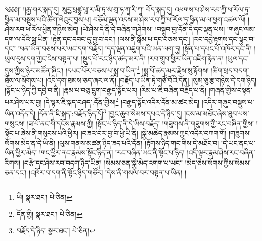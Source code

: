 \setcounter{footnote}{0} 
༄༅༅།། །།རྒྱ་གར་སྐད་དུ། ཨཱརྱ་པྲཛྙཱ་པཱ་ར་མི་ཏཱ་སཾ་གྲ་ཧ་ཀཱ་རི་ཀཱ། བོད་སྐད་དུ། འཕགས་པ་ཤེས་རབ་ཀྱི་ཕ་རོལ་ཏུ་ཕྱིན་མ་བསྡུས་པའི་ཚིག་ལེའུར་བྱས་པ། བཅོམ་ལྡན་འདས་མ་ཤེས་རབ་ཀྱི་ཕ་རོལ་ཏུ་ཕྱིན་མ་ལ་ཕྱག་འཚལ་ལོ། །ཤེས་རབ་ཕ་རོལ་ཕྱིན་གཉིས་མེད། །ཡེ་ཤེས་དེ་ནི་དེ་བཞིན་གཤེགས། །བསྒྲུབ་བྱ་དོན་དེ་དང་ལྡན་པས། །གཞུང་ལམ་དག་ལ་དེའི་སྒྲ་ཡིན། །རྟེན་དང་དབང་དུ་བྱ་བ་དང་། །ལས་ནི་སྒོམ་པ་དང་བཅས་དང་། །རབ་དབྱེ་རྟགས་དང་ལྟུང་བ་དང་། །ཕན་ཡོན་བཅས་པར་ཡང་དག་བརྗོད། །དད་ལྡན་འཇུག་པའི་ཡན་ལག་ཏུ། །སྟོན་པ་དཔང་པོ་འཁོར་དང་ནི། །ཡུལ་དུས་དག་ཀྱང་ངེས་བསྟན་པ། །སྡུད་པོ་རང་ཉིད་ཚད་མར་ནི། །རབ་གྲུབ་ཕྱིར་ཡིན་འཇིག་རྟེན་ན། །ཡུལ་དང་དུས་ཀྱིས་ཉེར་མཚོན་ཞིང་། །དཔང་པོར་བཅས་པ་སྨྲ་བ་ཡིན།\footnote{ཡི།  སྣར་ཐང་།  པེ་ཅིན། } །སྨྲ་པོ་ཚད་མར་རྗེས་སུ་རྟོགས། །ཚིག་ཕྲད་བདག་ཐོས་ལ་སོགས་པ། །འདི་དག་ཐམས་ཅད་ཞར་ལ་ནི། །བརྗོད་པ་ཡིན་ཏེ་གཙོ་བོའི་དོན། །སུམ་ཅུ་རྩ་གཉིས་དེ་དག་ཉིད། །སྟོང་པ་ཉིད་ཀྱི་དབྱེ་བ་ནི། །རྣམ་པ་བཅུ་དྲུག་བརྒྱད་སྟོང་པར། །རིམ་པ་ཇི་བཞིན་བརྗོད་པ་ནི། །གཞན་གྱིས་བསྟན་པར་ཤེས་པར་བྱ། །དེ་ལྟར་ཇི་སྐད་བཤད་:དོན་གྱིས།\footnote{དོན་གྱི།  སྣར་ཐང་།  པེ་ཅིན། } །བརྒྱད་སྟོང་འདིར་དོན་མ་ཚང་མེད། །འདིར་གཞུང་བསྡུས་པ་ཡིན་འདོད་དེ། །དོན་ནི་ཇི་སྐད་:བརྗོད་ཉིད་དོ།\footnote{བརྗོད་དེ་ཉིད།  སྣར་ཐང་།  པེ་ཅིན། } །བྱང་ཆུབ་སེམས་དཔའ་དེ་ཉིད་དུ། །ངས་མ་མཐོང་ཞེས་ཐུབ་པས་གསུངས། །ཟ་པོ་ནང་གི་དངོས་རྣམས་ཀྱི། །སྟོང་པ་ཉིད་ནི་དེ་ཡིས་བརྗོད། །གཟུགས་ནི་གཟུགས་ཀྱི་རང་བཞིན་གྱིས། །སྟོང་པ་ཞེས་ནི་གསུངས་པའི་ཕྱིར། །བཟའ་བར་བྱ་བ་ཕྱི་ཡི་ནི། །སྐྱེ་མཆེད་རྣམས་ཀྱང་འདིར་བཀག་གོ། །གཟུགས་སོགས་མེད་ན་དེ་ཡི་ནི། །ལུས་གནས་མཚན་ཉིད་ཟད་པའི་དོན། །རྟོགས་ཉིད་གང་གིས་དེ་མཐོང་བ། །དེ་ཡང་ནང་པ་ཡིན་ཕྱིར་མེད། །གང་ཕྱིར་ནང་རྣམས་སྟོང་ཉིད་ན། །རང་བཞིན་ཡང་ནི་སྟོང་པ་ཉིད། །འདི་ལྟར་རྣམ་ཤེས་རང་བཞིན་རིགས། །བརྩེ་དང་ཤེས་རབ་བདག་ཉིད་ཡིན། །སེམས་ཅན་སྐྱེ་མེད་འགག་པ་ཡང་། །མེད་ཅེས་སོགས་ཀྱིས་སེམས་ཅན་དང་། །འཁོར་བ་དག་ནི་སྟོང་ཉིད་གཙོར། །དེས་ནི་གསལ་བར་བསྟན་པ་ཡིན། །
